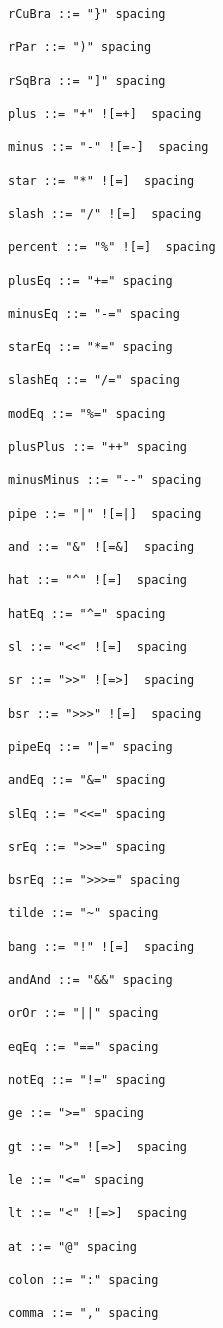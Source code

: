 \begin{lstlisting}[breaklines=true]
rCuBra ::= "}" spacing

rPar ::= ")" spacing

rSqBra ::= "]" spacing

plus ::= "+" ![=+]  spacing

minus ::= "-" ![=-]  spacing

star ::= "*" ![=]  spacing

slash ::= "/" ![=]  spacing

percent ::= "%" ![=]  spacing

plusEq ::= "+=" spacing

minusEq ::= "-=" spacing

starEq ::= "*=" spacing

slashEq ::= "/=" spacing

modEq ::= "%=" spacing

plusPlus ::= "++" spacing

minusMinus ::= "--" spacing

pipe ::= "|" ![=|]  spacing

and ::= "&" ![=&]  spacing

hat ::= "^" ![=]  spacing

hatEq ::= "^=" spacing

sl ::= "<<" ![=]  spacing

sr ::= ">>" ![=>]  spacing

bsr ::= ">>>" ![=]  spacing

pipeEq ::= "|=" spacing

andEq ::= "&=" spacing

slEq ::= "<<=" spacing

srEq ::= ">>=" spacing

bsrEq ::= ">>>=" spacing

tilde ::= "~" spacing

bang ::= "!" ![=]  spacing

andAnd ::= "&&" spacing

orOr ::= "||" spacing

eqEq ::= "==" spacing

notEq ::= "!=" spacing

ge ::= ">=" spacing

gt ::= ">" ![=>]  spacing

le ::= "<=" spacing

lt ::= "<" ![=>]  spacing

at ::= "@" spacing

colon ::= ":" spacing

comma ::= "," spacing


\end{lstlisting}
